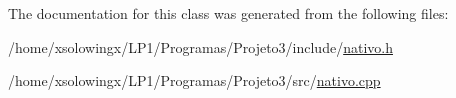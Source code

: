 The documentation for this class was generated from the following files\+:\begin{DoxyCompactItemize}
\item 
/home/xsolowingx/\+L\+P1/\+Programas/\+Projeto3/include/\hyperlink{nativo_8h}{nativo.\+h}\item 
/home/xsolowingx/\+L\+P1/\+Programas/\+Projeto3/src/\hyperlink{nativo_8cpp}{nativo.\+cpp}\end{DoxyCompactItemize}
